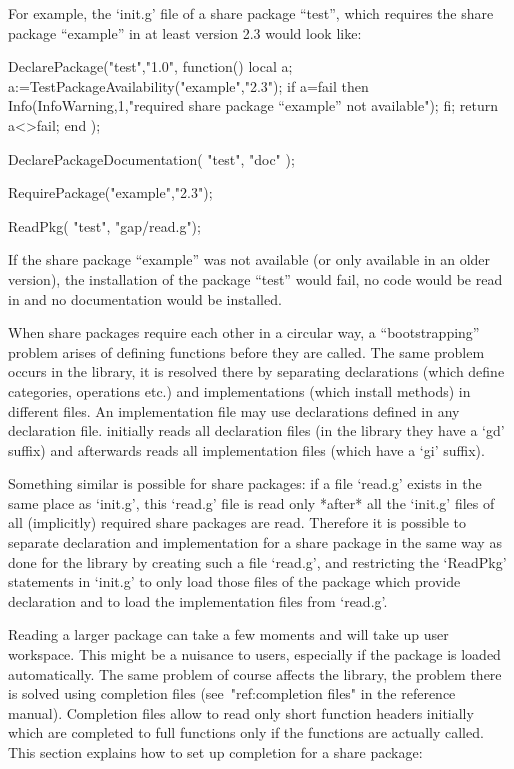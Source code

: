 For example, the `init.g' file of a share package ``test'', which requires
the share package ``example'' in at least version 2.3 would look like:

\begintt
DeclarePackage("test","1.0",
  function()
  local a;
    a:=TestPackageAvailability("example","2.3");
    if a=fail then
      Info(InfoWarning,1,"required share package ``example'' not available");
    fi;
    return a<>fail;
  end
  );

DeclarePackageDocumentation( "test", "doc" );

RequirePackage("example","2.3");

ReadPkg( "test", "gap/read.g");
\endtt

If the share package ``example'' was not available (or only available in an
older version), the installation of the package ``test'' would fail, no code
would be read in and no documentation would be installed.


When  share   packages  require  each other    in  a  circular  way, a
``bootstrapping'' problem arises of defining functions before they are
called. The same  problem occurs in the  library, it is resolved there
by separating declarations (which  define categories, operations etc.)
and   implementations (which install methods)   in different files. An
implementation  file may use   declarations defined in any declaration
file.   {\GAP} initially reads all  declaration  files (in the library
they have a `gd' suffix) and afterwards reads all implementation files
(which have a `gi' suffix).

Something similar  is possible for  share packages: if a file `read.g'
exists in the same place as `init.g',  this `read.g' file is read only
*after*  all  the `init.g' files   of  all (implicitly) required share
packages  are read.  Therefore  it is possible to separate declaration
and implementation for a share package in the same way as done for the
library  by  creating  such  a file   `read.g',   and restricting  the
`ReadPkg' statements  in  `init.g' to  only load   those  files of the
package which provide declaration and to load the implementation files
from `read.g'.


Reading a larger package can take a few moments and will take up user
workspace. This might be a nuisance to users, especially if the package is
loaded automatically.
The same problem of course affects the library, the problem there is solved
using completion files (see~"ref:completion files" in the reference manual).
Completion files allow to read only short function headers initially which
are completed to full functions only if the functions are actually called.
This section explains how to set up completion for a share package:

